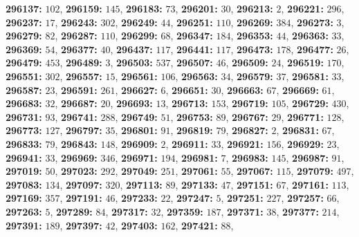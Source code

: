 \textsf{\bfseries 296137:} $102$, \textsf{\bfseries 296159:} $145$, \textsf{\bfseries 296183:} $73$, \textsf{\bfseries 296201:} $30$, \textsf{\bfseries 296213:} $2$, \textsf{\bfseries 296221:} $296$, \textsf{\bfseries 296237:} $17$, \textsf{\bfseries 296243:} $302$, \textsf{\bfseries 296249:} $44$, \textsf{\bfseries 296251:} $110$, \textsf{\bfseries 296269:} $384$, \textsf{\bfseries 296273:} $3$, \textsf{\bfseries 296279:} $82$, \textsf{\bfseries 296287:} $110$, \textsf{\bfseries 296299:} $68$, \textsf{\bfseries 296347:} $184$, \textsf{\bfseries 296353:} $44$, \textsf{\bfseries 296363:} $33$, \textsf{\bfseries 296369:} $54$, \textsf{\bfseries 296377:} $40$, \textsf{\bfseries 296437:} $117$, \textsf{\bfseries 296441:} $117$, \textsf{\bfseries 296473:} $178$, \textsf{\bfseries 296477:} $26$, \textsf{\bfseries 296479:} $453$, \textsf{\bfseries 296489:} $3$, \textsf{\bfseries 296503:} $537$, \textsf{\bfseries 296507:} $46$, \textsf{\bfseries 296509:} $24$, \textsf{\bfseries 296519:} $170$, \textsf{\bfseries 296551:} $302$, \textsf{\bfseries 296557:} $15$, \textsf{\bfseries 296561:} $106$, \textsf{\bfseries 296563:} $34$, \textsf{\bfseries 296579:} $37$, \textsf{\bfseries 296581:} $33$, \textsf{\bfseries 296587:} $23$, \textsf{\bfseries 296591:} $261$, \textsf{\bfseries 296627:} $6$, \textsf{\bfseries 296651:} $30$, \textsf{\bfseries 296663:} $67$, \textsf{\bfseries 296669:} $61$, \textsf{\bfseries 296683:} $32$, \textsf{\bfseries 296687:} $20$, \textsf{\bfseries 296693:} $13$, \textsf{\bfseries 296713:} $153$, \textsf{\bfseries 296719:} $105$, \textsf{\bfseries 296729:} $430$, \textsf{\bfseries 296731:} $93$, \textsf{\bfseries 296741:} $288$, \textsf{\bfseries 296749:} $51$, \textsf{\bfseries 296753:} $89$, \textsf{\bfseries 296767:} $29$, \textsf{\bfseries 296771:} $128$, \textsf{\bfseries 296773:} $127$, \textsf{\bfseries 296797:} $35$, \textsf{\bfseries 296801:} $91$, \textsf{\bfseries 296819:} $79$, \textsf{\bfseries 296827:} $2$, \textsf{\bfseries 296831:} $67$, \textsf{\bfseries 296833:} $79$, \textsf{\bfseries 296843:} $148$, \textsf{\bfseries 296909:} $2$, \textsf{\bfseries 296911:} $33$, \textsf{\bfseries 296921:} $156$, \textsf{\bfseries 296929:} $23$, \textsf{\bfseries 296941:} $33$, \textsf{\bfseries 296969:} $346$, \textsf{\bfseries 296971:} $194$, \textsf{\bfseries 296981:} $7$, \textsf{\bfseries 296983:} $145$, \textsf{\bfseries 296987:} $91$, \textsf{\bfseries 297019:} $50$, \textsf{\bfseries 297023:} $292$, \textsf{\bfseries 297049:} $251$, \textsf{\bfseries 297061:} $55$, \textsf{\bfseries 297067:} $115$, \textsf{\bfseries 297079:} $497$, \textsf{\bfseries 297083:} $134$, \textsf{\bfseries 297097:} $320$, \textsf{\bfseries 297113:} $89$, \textsf{\bfseries 297133:} $47$, \textsf{\bfseries 297151:} $67$, \textsf{\bfseries 297161:} $113$, \textsf{\bfseries 297169:} $357$, \textsf{\bfseries 297191:} $46$, \textsf{\bfseries 297233:} $22$, \textsf{\bfseries 297247:} $5$, \textsf{\bfseries 297251:} $227$, \textsf{\bfseries 297257:} $66$, \textsf{\bfseries 297263:} $5$, \textsf{\bfseries 297289:} $84$, \textsf{\bfseries 297317:} $32$, \textsf{\bfseries 297359:} $187$, \textsf{\bfseries 297371:} $38$, \textsf{\bfseries 297377:} $214$, \textsf{\bfseries 297391:} $189$, \textsf{\bfseries 297397:} $42$, \textsf{\bfseries 297403:} $162$, \textsf{\bfseries 297421:} $88$, 

